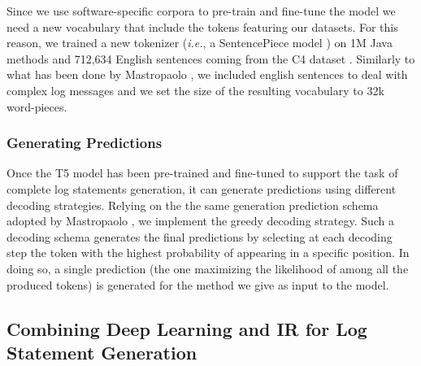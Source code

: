 Since we use software-specific corpora to pre-train and fine-tune the model we need a new vocabulary that include the \java tokens featuring our datasets. For this reason, we trained a new tokenizer (\emph{i.e.}, a SentencePiece model \cite{kudo2018sentencepiece}) on 1M Java methods and 712,634 English sentences coming from the C4 dataset \cite{raffel2019exploring}. Similarly to what has been done by Mastropaolo \etal \cite{mastropaolo2022using}, we included english sentences to deal with complex log messages and we set the size of the resulting vocabulary to 32k word-pieces.


\subsubsection{Generating Predictions}
Once the T5 model has been pre-trained and fine-tuned to support the task of complete log statements generation, it can generate predictions using different decoding strategies. Relying on the the same generation prediction schema adopted by Mastropaolo \etal \cite{mastropaolo2022using}, we implement the greedy decoding strategy. Such a decoding schema generates the final predictions by selecting at each decoding step the token with the highest probability of appearing in a specific position. In doing so, a single prediction (\ie the one maximizing the likelihood of among all the produced tokens) is generated for the method we give as input to the model.

%
%
%
%

\subsection{Combining Deep Learning and IR for Log Statement Generation}


